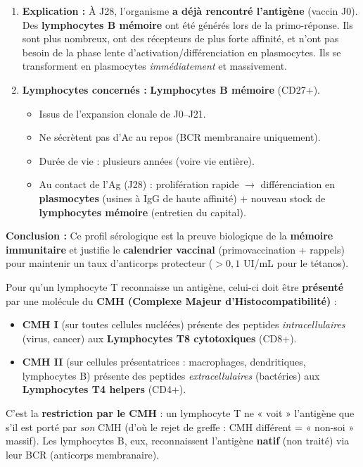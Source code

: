 \documentclass[11pt]{article}
\begin{document}
\begin{exoresolu}
\begin{enumerate}
    \item \textbf{Explication :} À J28, l'organisme \textbf{a déjà rencontré l'antigène} (vaccin J0). Des \textbf{lymphocytes B mémoire} ont été générés lors de la primo-réponse. Ils sont plus nombreux, ont des récepteurs de plus forte affinité, et n'ont pas besoin de la phase lente d'activation/différenciation en plasmocytes. Ils se transforment en plasmocytes \emph{immédiatement} et massivement.
    
    \item \textbf{Lymphocytes concernés :} \textbf{Lymphocytes B mémoire} (CD27+). 
    \begin{itemize}
        \item Issus de l'expansion clonale de J0--J21.
        \item Ne sécrètent pas d'Ac au repos (BCR membranaire uniquement).
        \item Durée de vie : plusieurs années (voire vie entière).
        \item Au contact de l'Ag (J28) : prolifération rapide $\rightarrow$ différenciation en \textbf{plasmocytes} (usines à IgG de haute affinité) + nouveau stock de \textbf{lymphocytes mémoire} (entretien du capital).
    \end{itemize}
\end{enumerate}

\textbf{Conclusion :} Ce profil sérologique est la preuve biologique de la \textbf{mémoire immunitaire} et justifie le \textbf{calendrier vaccinal} (primovaccination + rappels) pour maintenir un taux d'anticorps protecteur ($> 0,1$ UI/mL pour le tétanos).
\end{exoresolu}

\begin{savaistu}
Pour qu'un lymphocyte T reconnaisse un antigène, celui-ci doit être \textbf{présenté} par une molécule du \textbf{CMH (Complexe Majeur d'Histocompatibilité)} : 
\begin{itemize}
    \item \textbf{CMH I} (sur toutes cellules nucléées) présente des peptides \emph{intracellulaires} (virus, cancer) aux \textbf{Lymphocytes T8 cytotoxiques} (CD8+).
    \item \textbf{CMH II} (sur cellules présentatrices : macrophages, dendritiques, lymphocytes B) présente des peptides \emph{extracellulaires} (bactéries) aux \textbf{Lymphocytes T4 helpers} (CD4+).
\end{itemize}
C'est la \textbf{restriction par le CMH} : un lymphocyte T ne « voit » l'antigène que s'il est porté par \emph{son} CMH (d'où le rejet de greffe : CMH différent = « non-soi » massif). Les lymphocytes B, eux, reconnaissent l'antigène \textbf{natif} (non traité) via leur BCR (anticorps membranaire).
\end{savaistu}
\end{document}
